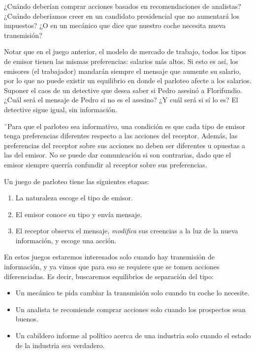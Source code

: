 \documentclass[12pt]{article}
\begin{document}
¿Cuándo deberían comprar acciones basados en recomendaciones de analistas? ¿Cuándo deberíamos creer en un candidato presidencial que no aumentará los impuestos? ¿O en un mecánico que dice que nuestro coche necesita nueva transmisión?

Notar que en el juego anterior, el modelo de mercado de trabajo, todos los tipos de emisor tienen las mismas preferencias: salarios más altos. Si esto es así, los emisores (el trabajador) mandarán siempre el mensaje que aumente su salario, por lo que no puede existir un equilibrio en donde el parloteo afecte a los salarios. Suponer el caos de un detective que desea saber si Pedro asesinó a Florifundio. ¿Cuál será el mensaje de Pedro si no es el asesino? ¿Y cuál será si sí lo es? El detective sigue igual, sin información.

¨Para que el parloteo sea informativo, una condición es que cada tipo de emisor tenga preferencias diferentes respecto a las acciones del receptor. Además, las preferencias del receptor sobre sus acciones no deben ser diferentes u opuestas a las del emisor. No se puede dar comunicación si son contrarias, dado que el emisor siempre querría confundir al receptor sobre sus preferencias.

Un juego de parloteo tiene las siguientes etapas:

\begin{enumerate}
\setlength{\itemsep}{0pt}
\setlength{\parskip}{0pt}
\setlength{\parsep}{0pt}
	\item La naturaleza escoge el tipo de emisor.
	\item El emisor conoce su tipo y envía mensaje.
	\item El receptor observa el mensaje, \textit{modifica} sus creencias a la luz de la nueva información, y escoge una acción.
\end{enumerate}

En estos juegos estaremos interesados solo cuando hay transmisión de información, y ya vimos que para eso se requiere que se tomen acciones diferenciadas. Es decir, buscaremos equilibrios de separación del tipo:

\begin{itemize}
\setlength{\itemsep}{0pt}
\setlength{\parskip}{0pt}
\setlength{\parsep}{0pt}
	\item Un mecánico te pida cambiar la transmisión solo cuando tu coche lo necesite.
	\item Un analista te recomiende comprar acciones solo cuando los prospectos sean buenos.
	\item Un cabildero informe al político acerca de una industria solo cuando el estado de la industria sea verdadero.
\end{itemize} 
\end{document}
